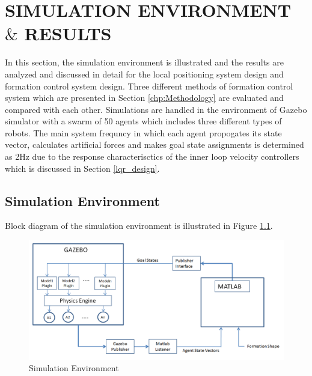 

\chapter{SIMULATION ENVIRONMENT $\&$ RESULTS}
\label{chp:simulation}













In this section, the simulation environment is illustrated and the results are analyzed and discussed in detail for the local positioning system design and formation control system design. Three different methods of formation control system which are presented in Section \ref{chp:Methodology} are evaluated and compared with each other. Simulations are handled in the environment of Gazebo simulator with a swarm of 50 agents which includes three different types of robots. The main system frequncy in which each agent propogates its state vector, calculates artificial forces and makes goal state assignments is determined as 2Hz due to the response characterisctics of the inner loop velocity controllers which is discussed in Section \ref{lqr_design}. 

\section{Simulation Environment}
Block diagram of the simulation environment is illustrated in Figure \ref{simulation_env_ref}.

\begin{figure}[H]
\caption{Simulation Environment} \label{simulation_env_ref}
\centering
\includegraphics[scale = 0.45]{environment}
\end{figure}
    
